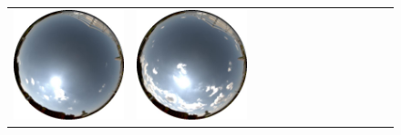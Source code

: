 \documentclass{report}
\begin{document}
\begin{figure}[!th]
\begin{tabular}{@{}rcccccccccccc@{}}
    \includegraphics[width=\customwidth]{./figures/database/20130824_120033.jpg} &
    \includegraphics[width=\customwidth]{./figures/database/20130824_123024.jpg} &

\end{tabular}
\end{figure}
\end{document}
